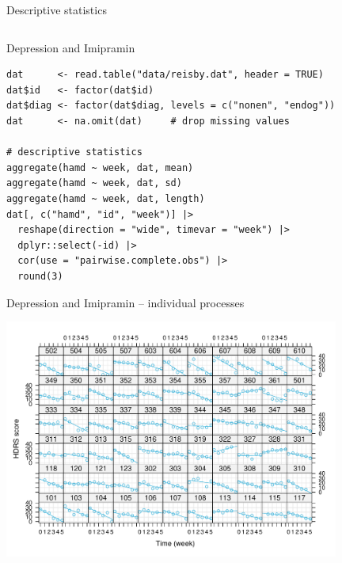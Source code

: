 \documentclass[aspectratio=169]{beamer}
\begin{document}
\begin{frame}{Descriptive statistics}
\begin{columns}
\begin{column}{.6\textwidth}
  \vspace{1cm}
\end{column}
\end{columns}
\end{frame}

\begin{frame}[fragile]{Depression and Imipramin}
  \begin{lstlisting}
dat      <- read.table("data/reisby.dat", header = TRUE)
dat$id   <- factor(dat$id)
dat$diag <- factor(dat$diag, levels = c("nonen", "endog"))
dat      <- na.omit(dat)     # drop missing values

# descriptive statistics
aggregate(hamd ~ week, dat, mean)
aggregate(hamd ~ week, dat, sd)
aggregate(hamd ~ week, dat, length)
dat[, c("hamd", "id", "week")] |>
  reshape(direction = "wide", timevar = "week") |>
  dplyr::select(-id) |>
  cor(use = "pairwise.complete.obs") |>
  round(3)
  \end{lstlisting}
\end{frame}


\begin{frame}{Depression and Imipramin -- individual processes}
  \vspace{-.2cm}
  \begin{center}
    \includegraphics[width = 11cm]{fig/hdrs-ind}
  \end{center}
\end{frame}
\end{document}
